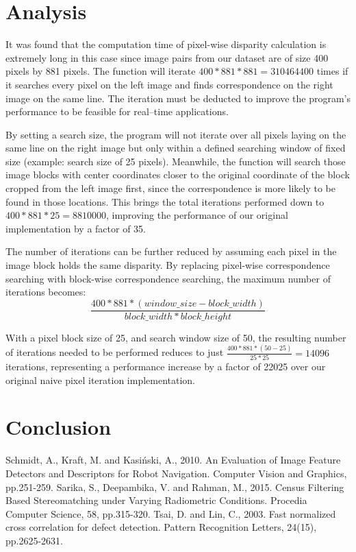 \documentclass[conference]{IEEEtran}
\begin{document}
\vspace{10pt}
\section{Analysis}
It was found that the computation time of pixel-wise disparity calculation is extremely long in this case since image pairs from our dataset are of size 400 pixels by 881 pixels. The function will iterate $400*881*881=310464400$ times if it searches every pixel on the left image and finds correspondence on the right image on the same line. The iteration must be deducted to improve the program's performance to be feasible for real--time applications.

By setting a search size, the program will not iterate over all pixels laying on the same line on the right image but only within a defined searching window of fixed size (example: search size of 25 pixels). Meanwhile, the function will search those image blocks with center coordinates closer to the original coordinate of the block cropped from the left image first, since the correspondence is more likely to be found in those locations. This brings the total iterations performed down to $400*881*25=8810000$, improving the performance of our original implementation by a factor of 35.

The number of iterations can be further reduced by assuming each pixel in the image block holds the same disparity. By replacing pixel-wise correspondence searching with block-wise correspondence searching, the maximum number of iterations becomes:
\begin{equation*}
    \frac{400*881*(window\_size-block\_width)}{block\_width*block\_height}
\end{equation*}

With a pixel block size of 25, and search window size of 50, the resulting number of iterations needed to be performed reduces to just $\frac{400*881*(50-25)}{25*25}=14096$ iterations, representing a performance increase by a factor of 22025 over our original naive pixel iteration implementation.

\vspace{10pt}
\section{Conclusion}

\newpage
\begin{thebibliography}{00}
 Schmidt, A., Kraft, M. and Kasiński, A., 2010. An Evaluation of Image Feature Detectors and Descriptors for Robot Navigation. Computer Vision and Graphics, pp.251-259.
 Sarika, S., Deepambika, V. and Rahman, M., 2015. Census Filtering Based Stereomatching under Varying Radiometric Conditions. Procedia Computer Science, 58, pp.315-320.
 Tsai, D. and Lin, C., 2003. Fast normalized cross correlation for defect detection. Pattern Recognition Letters, 24(15), pp.2625-2631.
\end{thebibliography}
\vspace{10pt}
\end{document}

